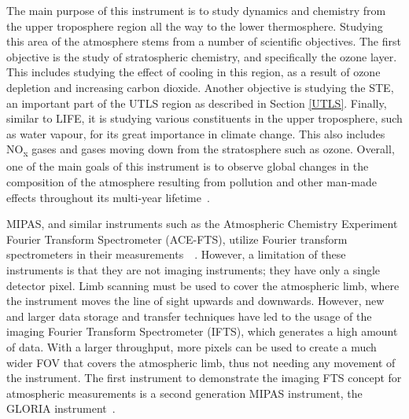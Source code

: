 The main purpose of this instrument is to study dynamics and chemistry from the upper troposphere region all the way to the lower thermosphere. Studying this area of the atmosphere stems from a number of scientific objectives. The first objective is the study of stratospheric chemistry, and specifically the ozone layer. This includes studying the effect of cooling in this region, as a result of ozone depletion and increasing carbon dioxide. Another objective is studying the STE, an important part of the UTLS region as described in Section \ref{UTLS}. Finally, similar to LIFE, it is studying various constituents in the upper troposphere, such as water vapour, for its great importance in climate change. This also includes NO\textsubscript{x} gases and gases moving down from the stratosphere such as ozone. Overall, one of the main goals of this instrument is to observe global changes in the composition of the atmosphere resulting from pollution and other man-made effects throughout its multi-year lifetime~\citep{MIPAS_instrument}.

MIPAS, and similar instruments such as the Atmospheric Chemistry Experiment Fourier Transform Spectrometer (ACE-FTS), utilize Fourier transform spectrometers in their measurements~\citep{SPARC}~\citep{ACE_conference}. However, a limitation of these instruments is that they are not imaging instruments; they have only a single detector pixel. Limb scanning must be used to cover the atmospheric limb, where the instrument moves the line of sight upwards and downwards. However, new and larger data storage and transfer techniques have led to the usage of the imaging Fourier Transform Spectrometer (IFTS), which generates a high amount of data. With a larger throughput, more pixels can be used to create a much wider FOV that covers the atmospheric limb, thus not needing any movement of the instrument. The first instrument to demonstrate the imaging FTS concept for atmospheric measurements is a second generation MIPAS instrument, the GLORIA instrument~\citep{GLORIA_concept}.

